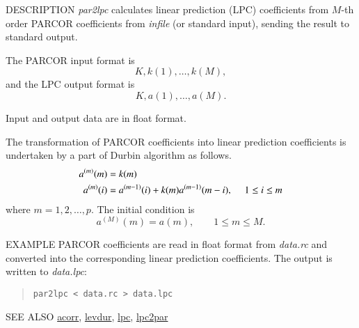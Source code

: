\begin{qsection}{DESCRIPTION}
{\em par2lpc} calculates linear prediction (LPC) coefficients 
from $M$-th order PARCOR coefficients from {\em infile} (or standard input), 
sending the result to standard output.

The PARCOR input format is
\begin{displaymath}
  K, k(1),\dots, k(M), 
\end{displaymath}
and the LPC output format is
\begin{displaymath}
  K, a(1),\dots, a(M).
\end{displaymath}

Input and output data are in float format.

The transformation of PARCOR coefficients into 
linear prediction coefficients is undertaken 
by a part of Durbin algorithm as follows.
\begin{align} 
a^{(m)}(m) &= k(m) \notag \\
a^{(m)}(i) &= a^{(m-1)}(i) + k(m) a^{(m-1)}(m-i), ~~~~~1\leq i \leq m \notag
\end{align}
where  $m=1, 2, \dots, p$.
The initial condition is 
\begin{displaymath}
a^{(M)}(m) = a(m), \qquad 1 \leq m \leq M.
\end{displaymath}
\end{qsection}

\begin{options}
\end{options}

\begin{qsection}{EXAMPLE}
PARCOR coefficients are read in float format from {\em data.rc}
and converted into the corresponding linear prediction coefficients.
The output is written to {\em data.lpc}:
\begin{quote}
 \verb!par2lpc < data.rc > data.lpc!
\end{quote} 
\end{qsection}

\begin{qsection}{SEE ALSO}
\hyperlink{acorr}{acorr},
\hyperlink{levdur}{levdur},
\hyperlink{lpc}{lpc},
\hyperlink{lpc2par}{lpc2par}
\end{qsection}
